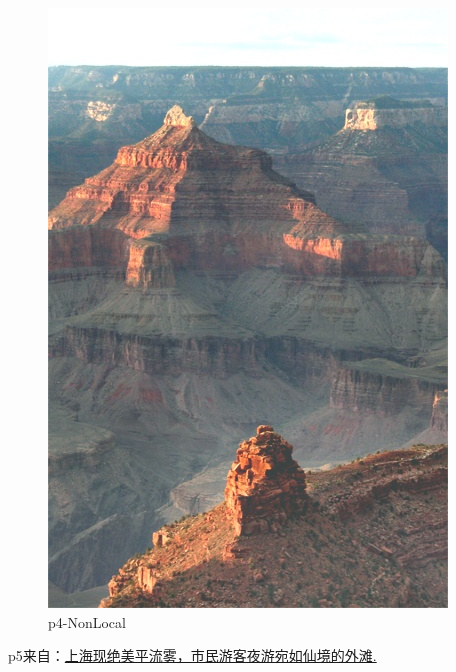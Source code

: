 \documentclass[12pt]{article}
\begin{document}
\begin{figure}[!h]
\begin{minipage}[t]{0.24\linewidth}
        \includegraphics[width=0.9\linewidth]{sample_pictures/after_p4_NonLocal.jpg}
        \caption*{p4-NonLocal}
    \end{minipage}
 \end{figure}\par
 p5来自：\href{https://export.shobserver.com/baijiahao/html/572518.html}{上海现绝美平流雾，市民游客夜游宛如仙境的外滩.}
\end{document}
